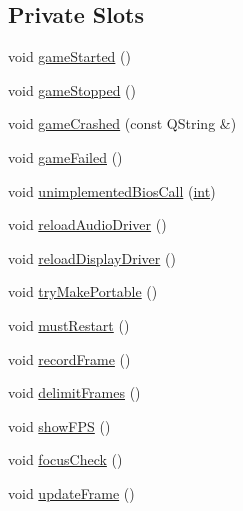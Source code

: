 \subsection*{Private Slots}
\begin{DoxyCompactItemize}
\item 
void \mbox{\hyperlink{class_q_g_b_a_1_1_window_a6260cb425f1ee6f8f808eaa195a0557f}{game\+Started}} ()
\item 
void \mbox{\hyperlink{class_q_g_b_a_1_1_window_a1dc3c78cd77d281e0604f69da146f33a}{game\+Stopped}} ()
\item 
void \mbox{\hyperlink{class_q_g_b_a_1_1_window_a09a4bcd828c324cfeac69ba112f2b8a4}{game\+Crashed}} (const Q\+String \&)
\item 
void \mbox{\hyperlink{class_q_g_b_a_1_1_window_a0dab910499bdba9274abdb3dfeb699f1}{game\+Failed}} ()
\item 
void \mbox{\hyperlink{class_q_g_b_a_1_1_window_a9364322857735a4bca2b01f69955b123}{unimplemented\+Bios\+Call}} (\mbox{\hyperlink{ioapi_8h_a787fa3cf048117ba7123753c1e74fcd6}{int}})
\item 
void \mbox{\hyperlink{class_q_g_b_a_1_1_window_a73b1dabfc487f31687b92bb4bb24a425}{reload\+Audio\+Driver}} ()
\item 
void \mbox{\hyperlink{class_q_g_b_a_1_1_window_a01573d875972842fe908b15797ce1e06}{reload\+Display\+Driver}} ()
\item 
void \mbox{\hyperlink{class_q_g_b_a_1_1_window_aca690184ec03e5491f7910a37001cf26}{try\+Make\+Portable}} ()
\item 
void \mbox{\hyperlink{class_q_g_b_a_1_1_window_a1cd84a8fb644383b4e29f8d76bd3ba5a}{must\+Restart}} ()
\item 
void \mbox{\hyperlink{class_q_g_b_a_1_1_window_aeb3706ed31f139076d72aaa85c1a954b}{record\+Frame}} ()
\item 
void \mbox{\hyperlink{class_q_g_b_a_1_1_window_ab21ffaf9ea23fa88ba49d691c65af206}{delimit\+Frames}} ()
\item 
void \mbox{\hyperlink{class_q_g_b_a_1_1_window_ace8436461a769c9d941c8cbcf82cf79f}{show\+F\+PS}} ()
\item 
void \mbox{\hyperlink{class_q_g_b_a_1_1_window_a39a941c33d3f50cbb26819448366578d}{focus\+Check}} ()
\item 
void \mbox{\hyperlink{class_q_g_b_a_1_1_window_a515e9d32237b1340e77b02a08789783c}{update\+Frame}} ()
\end{DoxyCompactItemize}
